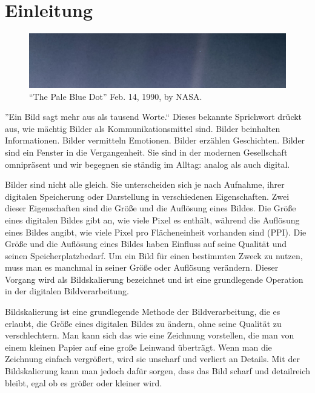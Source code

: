 



\chapter{Einleitung}

\begin{center}
\begin{figure}[h]
    \includegraphics[width=\textwidth]{img/PIA23645_PaleBlueDotRevisited_1600.jpg}
    \caption{``The Pale Blue Dot'' Feb. 14, 1990, by NASA\footnotemark.}
    \label{fig:my_label}
\end{figure}
\end{center}

''Ein Bild sagt mehr aus als tausend Worte.`` Dieses bekannte Sprichwort drückt aus, wie mächtig Bilder als Kommunikationsmittel sind. Bilder beinhalten Informationen. Bilder vermitteln Emotionen. Bilder erzählen Geschichten. Bilder sind ein Fenster in die Vergangenheit. Sie sind in der modernen Gesellschaft omnipräsent und wir begegnen sie ständig im Alltag: analog als auch digital.

Bilder sind nicht alle gleich. Sie unterscheiden sich je nach Aufnahme, ihrer digitalen Speicherung oder Darstellung in verschiedenen Eigenschaften. Zwei dieser Eigenschaften sind die Größe und die Auflösung eines Bildes. Die Größe eines digitalen Bildes gibt an, wie viele Pixel es enthält, während die Auflösung eines Bildes angibt, wie viele Pixel pro Flächeneinheit vorhanden sind (PPI). Die Größe und die Auflösung eines Bildes haben Einfluss auf seine Qualität und seinen Speicherplatzbedarf. Um ein Bild für einen bestimmten Zweck zu nutzen, muss man es manchmal in seiner Größe oder Auflösung verändern. Dieser Vorgang wird als Bildskalierung bezeichnet und ist eine grundlegende Operation in der digitalen Bildverarbeitung.

Bildskalierung ist eine grundlegende Methode der Bildverarbeitung, die es erlaubt, die Größe eines digitalen Bildes zu ändern, ohne seine Qualität zu verschlechtern. Man kann sich das wie eine Zeichnung vorstellen, die man von einem kleinen Papier auf eine große Leinwand überträgt. Wenn man die Zeichnung einfach vergrößert, wird sie unscharf und verliert an Details. Mit der Bildskalierung kann man jedoch dafür sorgen, dass das Bild scharf und detailreich bleibt, egal ob es größer oder kleiner wird.

